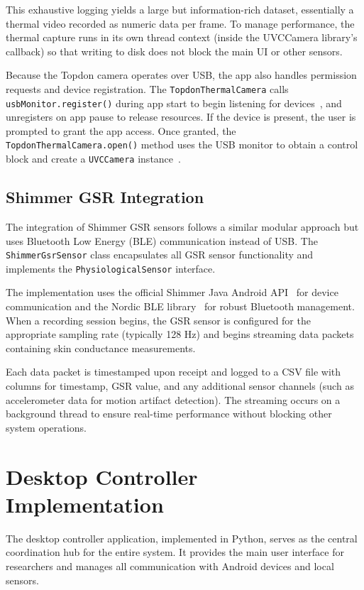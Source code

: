 This exhaustive logging yields a large but information-rich dataset, essentially a thermal video recorded as numeric data per frame. To manage performance, the thermal capture runs in its own thread context (inside the UVCCamera library's callback) so that writing to disk does not block the main UI or other sensors.

Because the Topdon camera operates over USB, the app also handles permission requests and device registration. The \texttt{TopdonThermalCamera} calls \texttt{usbMonitor.register()} during app start to begin listening for devices~\cite{serenegiant2025uvc}, and unregisters on app pause to release resources. If the device is present, the user is prompted to grant the app access. Once granted, the \texttt{TopdonThermalCamera.open()} method uses the USB monitor to obtain a control block and create a \texttt{UVCCamera} instance~\cite{serenegiant2025uvc}.

\subsection{Shimmer GSR Integration}

The integration of Shimmer GSR sensors follows a similar modular approach but uses Bluetooth Low Energy (BLE) communication instead of USB. The \texttt{ShimmerGsrSensor} class encapsulates all GSR sensor functionality and implements the \texttt{PhysiologicalSensor} interface.

The implementation uses the official Shimmer Java Android API~\cite{shimmer2025java} for device communication and the Nordic BLE library~\cite{nordic2025ble} for robust Bluetooth management. When a recording session begins, the GSR sensor is configured for the appropriate sampling rate (typically 128 Hz) and begins streaming data packets containing skin conductance measurements.

Each data packet is timestamped upon receipt and logged to a CSV file with columns for timestamp, GSR value, and any additional sensor channels (such as accelerometer data for motion artifact detection). The streaming occurs on a background thread to ensure real-time performance without blocking other system operations.

\section{Desktop Controller Implementation}

The desktop controller application, implemented in Python, serves as the central coordination hub for the entire system. It provides the main user interface for researchers and manages all communication with Android devices and local sensors.

